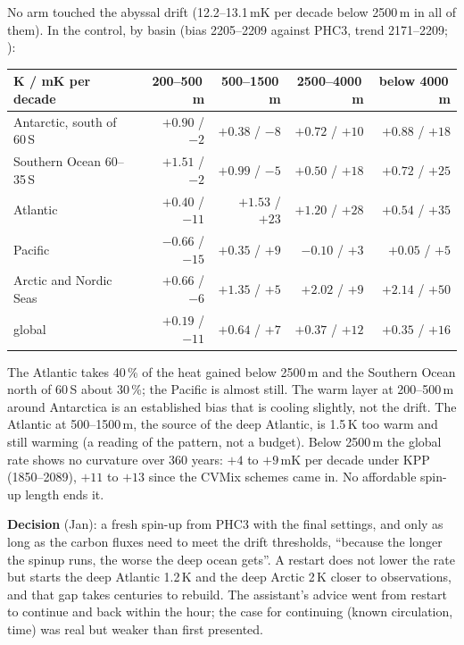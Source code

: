 \documentclass[10pt]{article}
\begin{document}
No arm touched the abyssal drift (12.2--13.1\,mK per decade below 2500\,m in all of them). In the
control, by basin (bias 2205--2209 against PHC3, trend 2171--2209;
):

\begin{center}\small
\begin{tabular}{lrrrr}
\toprule
K / mK per decade & 200--500\,m & 500--1500\,m & 2500--4000\,m & below 4000\,m \\
\midrule
Antarctic, south of 60\,S & $+0.90$ / $-2$ & $+0.38$ / $-8$ & $+0.72$ / $+10$ & $+0.88$ / $+18$ \\
Southern Ocean 60--35\,S & $+1.51$ / $-2$ & $+0.99$ / $-5$ & $+0.50$ / $+18$ & $+0.72$ / $+25$ \\
Atlantic & $+0.40$ / $-11$ & $+1.53$ / $+23$ & $+1.20$ / $+28$ & $+0.54$ / $+35$ \\
Pacific & $-0.66$ / $-15$ & $+0.35$ / $+9$ & $-0.10$ / $+3$ & $+0.05$ / $+5$ \\
Arctic and Nordic Seas & $+0.66$ / $-6$ & $+1.35$ / $+5$ & $+2.02$ / $+9$ & $+2.14$ / $+50$ \\
global & $+0.19$ / $-11$ & $+0.64$ / $+7$ & $+0.37$ / $+12$ & $+0.35$ / $+16$ \\
\bottomrule
\end{tabular}
\end{center}

The Atlantic takes 40\,\% of the heat gained below 2500\,m and the Southern Ocean north of 60\,S about
30\,\%; the Pacific is almost still. The warm layer at 200--500\,m around Antarctica is an established
bias that is cooling slightly, not the drift. The Atlantic at 500--1500\,m, the source of the deep
Atlantic, is 1.5\,K too warm and still warming (a reading of the pattern, not a budget). Below 2500\,m
the global rate shows no curvature over 360 years: $+4$ to $+9$\,mK per decade under KPP (1850--2089),
$+11$ to $+13$ since the CVMix schemes came in. No affordable spin-up length ends it.

\textbf{Decision} (Jan): a fresh spin-up from PHC3 with the final settings, and only as long as the
carbon fluxes need to meet the drift thresholds, ``because the longer the spinup runs, the worse the deep
ocean gets''. A restart does not lower the rate but starts the deep Atlantic 1.2\,K and the deep Arctic
2\,K closer to observations, and that gap takes centuries to rebuild. The assistant's advice went from
restart to continue and back within the hour; the case for continuing (known circulation, time) was
real but weaker than first presented.
\end{document}
